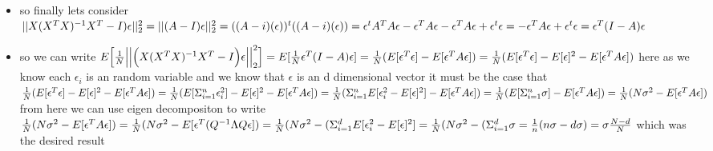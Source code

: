 \documentclass{article}
\begin{document}
\begin{enumerate}
\begin{itemize}
\begin{itemize}
\begin{itemize}
        \item this further implies that the $rank(X)=Rank(A)=d$
        \item and finally that the Eigenmatrix of A can be expressed as $\begin{pmatrix}1&0&...&0\\0&1..&0\\0&0&...&0
        \end{pmatrix}$ that is the identity matrix for the first d rows then zero matrix for the reaming rows 
    \end{itemize}
    \item so finally lets consider $||X(X^TX)^{-1}X^T-I)\epsilon||_{2}^{2}\\=||(A-I)\epsilon||_{2}^{2}=((A-i)(\epsilon))^{t}((A-i)(\epsilon))=\epsilon^tA^TA\epsilon-\epsilon^TA\epsilon-\epsilon^TA\epsilon+\epsilon^{t}\epsilon
    \\=-\epsilon^TA\epsilon+\epsilon^{t}\epsilon=\epsilon^{T}(I-A)\epsilon$
    \item so we can write $E \Big[ \frac{1}{N} \Big|\Big| \Big( X(X^TX)^{-1}X^T - I \Big) \epsilon \Big| \Big|^2_2 \Big]=E[\frac{1}{N}\epsilon^{T}(I-A)\epsilon]\\=\frac{1}{N}(E[\epsilon^{T}\epsilon]-E[\epsilon^{T}A\epsilon])=\frac{1}{N}(E[\epsilon^{T}\epsilon]-E[\epsilon]^2-E[\epsilon^{T}A\epsilon])$ here as we know each $\epsilon_{i}$ is an random variable and we know that $\epsilon$ is an d dimensional vector it must be the case that $\frac{1}{N}(E[\epsilon^{T}\epsilon]-E[\epsilon]^2-E[\epsilon^{T}A\epsilon])
    \\=\frac{1}{N}(E[\Sigma_{i=1}^{n}\epsilon_{i}^2]-E[\epsilon]^2-E[\epsilon^{T}A\epsilon])
    \\=\frac{1}{N}(\Sigma_{i=1}^{n}E[\epsilon_{i}^2-E[\epsilon]^2]-E[\epsilon^{T}A\epsilon])
    \\=\frac{1}{N}(E[\Sigma_{i=1}^{n}\sigma]-E[\epsilon^{T}A\epsilon])
    \\=\frac{1}{N}(N\sigma^2-E[\epsilon^{T}A\epsilon])$ from here we can use eigen decompositon to write $\frac{1}{N}(N\sigma^2-E[\epsilon^{T}A\epsilon])=\frac{1}{N}(N\sigma^2-E[\epsilon^{T}(Q^{-1}\Lambda Q \epsilon])=\frac{1}{N}(N\sigma^2-(\Sigma_{i=1}^{d}E[\epsilon_{i}^2-E[\epsilon]^2]=\frac{1}{N}(N\sigma^2-(\Sigma_{i=1}^{d}\sigma
    \\=\frac{1}{n}(n\sigma-d\sigma)\\=\sigma\frac{N-d}{N}$ which was the desired result 
\end{itemize}
  \end{itemize}
  

\end{enumerate}
\end{document}
